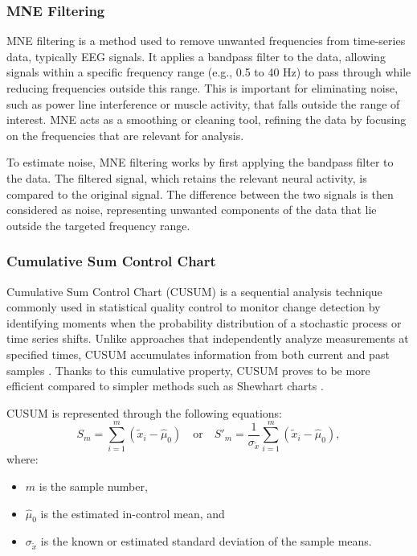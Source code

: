 \subsubsection{MNE Filtering}

MNE filtering is a method used to remove unwanted frequencies from time-series data, typically EEG signals. It applies a bandpass filter to the data, allowing signals within a specific frequency range (e.g., 0.5 to 40 Hz) to pass through while reducing frequencies outside this range. This is important for eliminating noise, such as power line interference or muscle activity, that falls outside the range of interest. MNE acts as a smoothing or cleaning tool, refining the data by focusing on the frequencies that are relevant for analysis.

To estimate noise, MNE filtering works by first applying the bandpass filter to the data. The filtered signal, which retains the relevant neural activity, is compared to the original signal. The difference between the two signals is then considered as noise, representing unwanted components of the data that lie outside the targeted frequency range.

\subsubsection{Cumulative Sum Control Chart}
Cumulative Sum Control Chart (CUSUM) is a sequential analysis technique commonly used in statistical quality control to monitor change detection \cite{basseville1993detection} by identifying moments when the probability distribution of a stochastic process or time series shifts. Unlike approaches that independently analyze measurements at specified times, CUSUM accumulates information from both current and past samples \cite{ncss2024}. Thanks to this cumulative property, CUSUM proves to be more efficient \cite{koshti2011cusum} compared to simpler methods such as Shewhart charts \cite{nelson1984shewhart}.

CUSUM is represented through the following equations:
\begin{equation}
S_m = \sum_{i=1}^{m} (\tilde{x}_i - \hat{\mu}_0) \quad \text{or} \quad S'_m = \frac{1}{\sigma_{\tilde{x}}} \sum_{i=1}^{m} (\tilde{x}_i - \hat{\mu}_0),
\end{equation}
where:
\begin{itemize}
    \item $m$ is the sample number,
    \vspace{-0.4cm}
    \item $\hat{\mu}_0$ is the estimated in-control mean, and
    \vspace{-0.4cm}
    \item $\sigma_{\tilde{x}}$ is the known or estimated standard deviation of the sample means.
\end{itemize}

